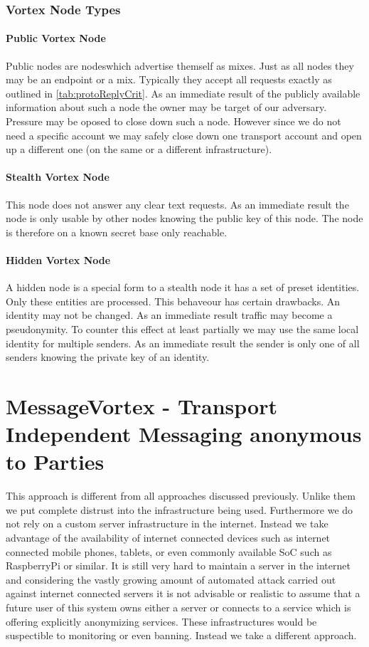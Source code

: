 \subsection{Vortex Node Types}

\subsubsection{Public Vortex Node}
Public nodes are nodeswhich advertise themself as mixes. Just as all nodes they may be an endpoint or a mix. Typically they accept all requests exactly as outlined in \ref{tab:protoReplyCrit}. As an immediate result of the publicly available information about such a node the owner may be target of our adversary. Pressure may be oposed to close down such a node. However since we do not need a specific account we may safely close down one transport account and open up a different one (on the same or a different infrastructure).

\subsubsection{Stealth Vortex Node\label{sec:stealthNode}}
This node does not answer any clear text requests. As an immediate result the node is only usable by other nodes knowing the public key of this node. The node is therefore on a known secret base only reachable.

\subsubsection{Hidden Vortex Node\label{sec:hiddenNode}}
A hidden node is a special form to a stealth node it has a set of preset identities. Only these entities are processed. This behaveour has certain drawbacks. An identity may not be changed. As an immediate result traffic may become a pseudonymity. To counter this effect at least partially we may use the same local identity for multiple senders. As an immediate result the sender is only one of all senders knowing the private key of an identity.

\chapter{MessageVortex - Transport Independent Messaging anonymous to  Parties\label{sec:spec}}
This approach is different from all approaches discussed previously. Unlike them we put complete distrust into the infrastructure being used. Furthermore we do not rely on a custom server infrastructure in the internet. Instead we take advantage of the availability of internet connected devices such as internet connected mobile phones, tablets, or even commonly available SoC such as RaspberryPi or similar. It is still very hard to maintain a server in the internet and considering the vastly growing amount of automated attack carried out against internet connected servers it is not advisable or realistic to assume that a future user of this system owns either a server or connects to a service which is offering explicitly anonymizing services. These infrastructures would be suspectible to monitoring or even banning. Instead we take a different approach.

